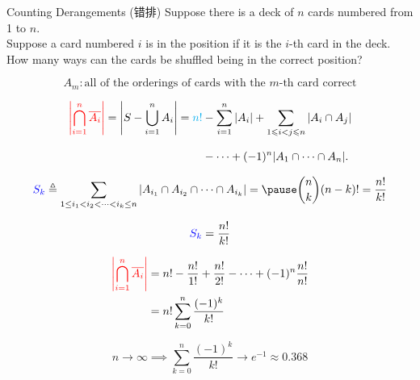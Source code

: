 \begin{frame}{}
  \begin{exampleblock}{Counting Derangements (错排)}
    Suppose there is a deck of $n$ cards numbered from 1 to $n$. \\
    Suppose a card numbered $i$ is in the  position
    if it is the $i$-th card in the deck.
    How many ways can the cards be shuffled 
    being in the correct position?
  \end{exampleblock}

  \pause
  \[
    A_{m}: \text{all of the orderings of cards with the } m\text{-th card correct}
  \]

  \pause
  \begin{align*}
    \textcolor{red}{\left|\bigcap_{i=1}^n \overline{A_i}\right|}
      = \left|S - \bigcup_{i=1}^n A_i \right|
      = \textcolor{cyan}{n!} &- \sum_{i=1}^n |A_i|
        + \sum_{1 \leqslant i < j \leqslant n} |A_i\cap A_j| \\[8pt]
        &- \cdots + (-1)^n |A_1\cap\cdots\cap A_n|.
  \end{align*}

  \pause
  \[
    \blue{S_{k}} \triangleq \sum_{1 \le i_{1} < i_{2} < \dots < i_{k} \le n}
      \left| A_{i_{1}} \cap A_{i_{2}} \cap \dots \cap A_{i_{k}} \right|
      = \pause \binom{n}{k} (n-k)! = \frac{n!}{k!}
  \]
\end{frame}

\begin{frame}{}
  \[
    \textcolor{blue}{S_{k}} = \frac{n!}{k!}
  \]

  \begin{align*}
    \textcolor{red}{\left|\bigcap_{i=1}^n \overline{A_i}\right|}
      &= n! - \frac{n!}{1!} + \frac{n!}{2!} - \dots + (-1)^{n}\frac{n!}{n!} \\
      &= n! \sum_{k=0}^{n} \frac{(-1)^{k}}{k!}
  \end{align*}

  \pause
  \[
    n \to \infty \implies \sum_{k=0}^{n} \frac{(-1)^{k}}{k!} \to e^{-1}
      \approx 0.368
  \]
\end{frame}

